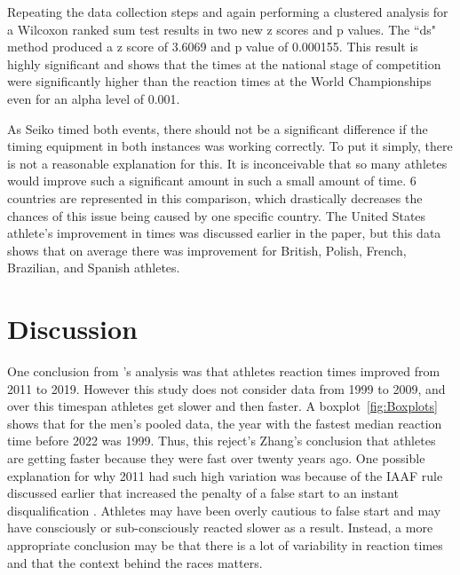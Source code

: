 \documentclass[12pt, letterpaper, titlepage]{article}
\begin{document}
Repeating the data collection steps and
again performing a clustered analysis for a Wilcoxon ranked sum test
results in two new z scores and p values.  The ``ds" method produced a z score of
3.6069 and p value of 0.000155.  This result is highly significant and shows that
the times at the national stage of competition were significantly higher than
the reaction times at the World Championships even for an alpha level of 0.001.

As Seiko timed both events, there should not be a significant
difference if the timing equipment in both instances was working correctly.
  To put it simply, there is not a reasonable explanation for 
this. It is inconceivable that so many athletes would improve such a significant
amount in such a small amount of time. 6 countries are represented in this 
comparison, which drastically decreases the chances of this issue being caused by
one specific country.  The United States athlete's improvement in times was
discussed earlier in the paper, but this data shows that on average there was
improvement for British, Polish, French, Brazilian, and Spanish athletes.


\section{Discussion}\label{sec:Discussion}

One conclusion from \citet{zhang2021correlation}'s analysis was that athletes
reaction times improved from 2011 to 2019.  However this study does not consider 
data from 1999 to 2009, and over this timespan athletes get slower and then
faster.  A boxplot~\ref{fig:Boxplots} shows that for the men's pooled data, the 
year with the fastest median reaction time before 2022 was 1999.  Thus, this 
reject's Zhang's conclusion that athletes are getting faster because they were 
fast over twenty years ago. One possible explanation for why 2011 had such
high variation was because of the IAAF rule discussed earlier that increased the
penalty of a false start to an instant disqualification \citep{iaaf2009falsestart}.
Athletes may have been overly cautious to false start and may have consciously
or sub-consciously reacted slower as a result.  Instead, a more appropriate 
conclusion may be that there is a lot of variability in reaction times and that
the context behind the races matters.
\end{document}
